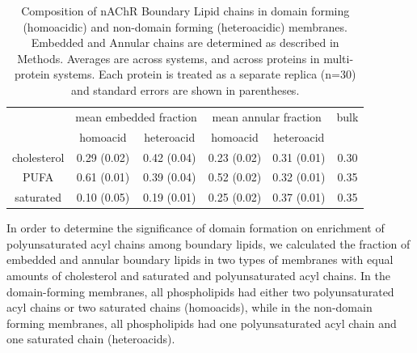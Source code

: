 \begin{table}[htbp]
  \centering
  \begin{tabular}{@{} c|cc|cc|c @{}}
     &\multicolumn{2}{c|}{mean embedded fraction}  &\multicolumn{2}{c|}{mean annular fraction} &bulk  \\ 
     & homoacid & heteroacid & homoacid & heteroacid  & \\ 
    \hline
    cholesterol & 0.29 (0.02)  & 0.42 (0.04) &0.23 (0.02)& 0.31 (0.01)& 0.30  \\ 
    PUFA  &0.61 (0.01)& 0.39 (0.04) & 0.52 (0.02) & 0.32 (0.01)&0.35\\ 
    saturated & 0.10 (0.05) & 0.19 (0.01) & 0.25 (0.02) & 0.37  (0.01)&0.35 \\ 
    \hline
  \end{tabular}
  	\begin{flushleft}
  \caption[Composition of nAChR Boundary Lipid chains in domain forming (homoacidic) and non-domain forming (heteroacidic) membranes.] {Composition of nAChR Boundary Lipid chains in domain forming (homoacidic) and non-domain forming (heteroacidic) membranes. Embedded and Annular chains are determined as described in Methods.  Averages are across systems, and across proteins in multi-protein systems.  Each protein is treated as a separate replica (n=30) and standard errors are shown in parentheses.}
  \label{tab:bound}
  	\end{flushleft}

\end{table}
     
%
%
%
%


In order to determine the significance of domain formation on enrichment of polyunsaturated acyl chains among boundary lipids, we calculated the fraction of embedded and annular boundary lipids in two types of membranes with equal amounts of cholesterol and saturated and polyunsaturated acyl chains.  In the domain-forming membranes, all phospholipids had either two polyunsaturated acyl chains or two saturated chains (homoacids), while in the non-domain forming membranes, all phospholipids had one polyunsaturated acyl chain and one saturated chain (heteroacids).  %

